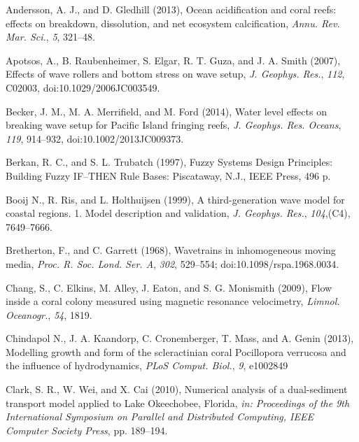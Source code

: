 \documentclass[default,jgrga]{agutex2015}
\begin{document}
\begin{article}
\begin{thebibliography}{}

Andersson, A. J., and D. Gledhill (2013), Ocean acidification and coral reefs: effects on breakdown, dissolution, and net ecosystem calcification, \textit{Annu. Rev. Mar. Sci.}, \textit{5}, 321--48.

Apotsos, A., B. Raubenheimer, S. Elgar, R. T. Guza, and J. A. Smith (2007), Effects of wave rollers and bottom stress on wave setup, \textit{J. Geophys. Res.}, \textit{112}, C02003, doi:10.1029/2006JC003549.

Becker, J. M., M. A. Merrifield, and M. Ford (2014), Water level effects on breaking wave setup for Pacific Island fringing reefs, \textit{J. Geophys. Res. Oceans}, \textit{119}, 914--932, doi:10.1002/2013JC009373.

Berkan, R. C., and S. L. Trubatch (1997), Fuzzy Systems Design Principles: Building Fuzzy IF–THEN Rule Bases: Piscataway, N.J., IEEE Press, 496 p.

Booij N., R. Ris, and L. Holthuijsen (1999), A third-generation wave model for coastal regions. 1. Model description and validation, \textit{J. Geophys. Res.}, \textit{104},(C4), 7649--7666.

Bretherton, F., and C. Garrett (1968), Wavetrains in inhomogeneous moving media, \textit{Proc. R. Soc. Lond. Ser. A}, \textit{302}, 529--554; doi:10.1098/rspa.1968.0034.

Chang, S., C. Elkins, M. Alley, J. Eaton, and S. G. Monismith (2009), Flow inside a coral colony measured using magnetic
resonance velocimetry, \textit{Limnol. Oceanogr.}, \textit{54}, 1819.

Chindapol N., J. A. Kaandorp, C. Cronemberger, T. Mass, and A. Genin (2013), Modelling growth and form of the scleractinian coral Pocillopora verrucosa and the influence of hydrodynamics, \textit{PLoS Comput. Biol.}, \textit{9}, e1002849

Clark, S. R., W. Wei, and X. Cai (2010), Numerical analysis of a dual-sediment transport model applied to Lake Okeechobee, Florida, \textit{in: Proceedings of the 9th International Symposium on Parallel and Distributed Computing, IEEE Computer Society Press}, pp. 189--194.


\end{thebibliography}
\end{article}
\end{document}
